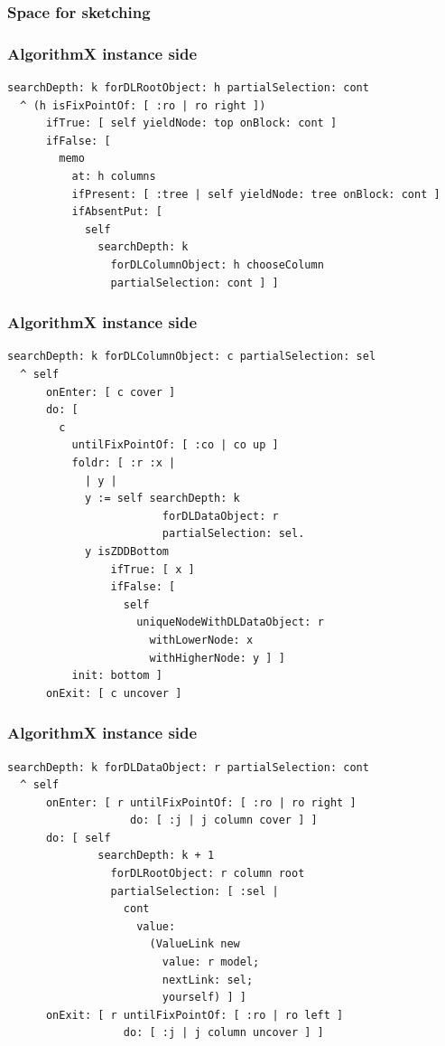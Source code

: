 \documentclass[10pt]{beamer}
\begin{document}
\begin{frame}[fragile]
\frametitle{Space for sketching}
\end{frame}

\begin{frame}[fragile]
\frametitle{AlgorithmX instance side}
\begin{verbatim}
searchDepth: k forDLRootObject: h partialSelection: cont
  ^ (h isFixPointOf: [ :ro | ro right ])
      ifTrue: [ self yieldNode: top onBlock: cont ]
      ifFalse: [ 
        memo
          at: h columns
          ifPresent: [ :tree | self yieldNode: tree onBlock: cont ]
          ifAbsentPut: [ 
            self
              searchDepth: k
                forDLColumnObject: h chooseColumn
                partialSelection: cont ] ]
\end{verbatim}
\end{frame}

\begin{frame}[fragile]
\frametitle{AlgorithmX instance side}
\begin{verbatim}
searchDepth: k forDLColumnObject: c partialSelection: sel
  ^ self
      onEnter: [ c cover ]
      do: [ 
        c
          untilFixPointOf: [ :co | co up ]
          foldr: [ :r :x | 
            | y |
            y := self searchDepth: k 
                        forDLDataObject: r 
                        partialSelection: sel.
            y isZDDBottom
                ifTrue: [ x ]
                ifFalse: [ 
                  self
                    uniqueNodeWithDLDataObject: r
                      withLowerNode: x
                      withHigherNode: y ] ]
          init: bottom ]
      onExit: [ c uncover ]
\end{verbatim}
\end{frame}

\begin{frame}[fragile]
\frametitle{AlgorithmX instance side}
\begin{verbatim}
searchDepth: k forDLDataObject: r partialSelection: cont
  ^ self
      onEnter: [ r untilFixPointOf: [ :ro | ro right ] 
                   do: [ :j | j column cover ] ]
      do: [ self
              searchDepth: k + 1
                forDLRootObject: r column root
                partialSelection: [ :sel | 
                  cont
                    value:
                      (ValueLink new
                        value: r model;
                        nextLink: sel;
                        yourself) ] ]
      onExit: [ r untilFixPointOf: [ :ro | ro left ] 
                  do: [ :j | j column uncover ] ]
\end{verbatim}
\end{frame}
\end{document}
